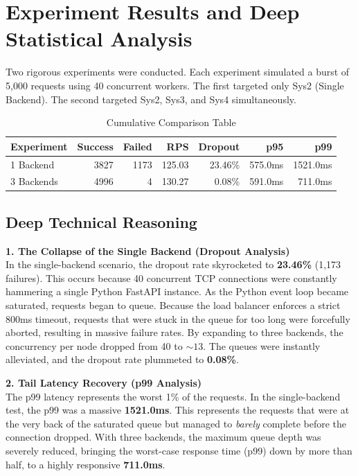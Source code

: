 \documentclass[12pt,a4paper]{article}
\begin{document}
\section{Experiment Results and Deep Statistical Analysis}
Two rigorous experiments were conducted. Each experiment simulated a burst of 5,000 requests using 40 concurrent workers. The first targeted only Sys2 (Single Backend). The second targeted Sys2, Sys3, and Sys4 simultaneously.

\begin{table}[H]
\centering
\caption{Cumulative Comparison Table}
\vspace{0.2cm}
\begin{tabular}{@{}lrrrrrr@{}}
\toprule
\textbf{Experiment} & \textbf{Success} & \textbf{Failed} & \textbf{RPS} & \textbf{Dropout} & \textbf{p95} & \textbf{p99} \\ \midrule
1 Backend           & 3827             & 1173            & 125.03       & 23.46\%          & 575.0ms      & 1521.0ms     \\
3 Backends          & 4996             & 4               & 130.27       & 0.08\%           & 591.0ms      & 711.0ms      \\ \bottomrule
\end{tabular}
\end{table}

\subsection*{Deep Technical Reasoning}

\textbf{1. The Collapse of the Single Backend (Dropout Analysis)} \\
In the single-backend scenario, the dropout rate skyrocketed to \textbf{23.46\%} (1,173 failures). This occurs because 40 concurrent TCP connections were constantly hammering a single Python FastAPI instance. As the Python event loop became saturated, requests began to queue. Because the load balancer enforces a strict 800ms timeout, requests that were stuck in the queue for too long were forcefully aborted, resulting in massive failure rates. 
By expanding to three backends, the concurrency per node dropped from 40 to $\sim13$. The queues were instantly alleviated, and the dropout rate plummeted to \textbf{0.08\%}.

\textbf{2. Tail Latency Recovery (p99 Analysis)} \\
The p99 latency represents the worst 1\% of the requests. In the single-backend test, the p99 was a massive \textbf{1521.0ms}. This represents the requests that were at the very back of the saturated queue but managed to \textit{barely} complete before the connection dropped. 
With three backends, the maximum queue depth was severely reduced, bringing the worst-case response time (p99) down by more than half, to a highly responsive \textbf{711.0ms}.
\end{document}
